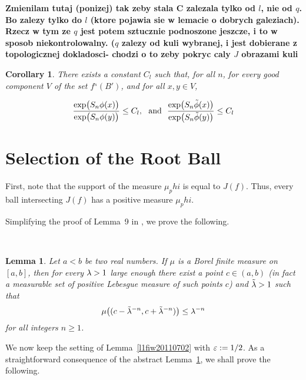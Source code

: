 \documentclass[12pt]{amsart}
\numberwithin{equation}{section}
\newcommand{\blem}{\begin{lem}}
\newcommand{\elem}{\end{lem}}
\newcommand{\nl}{\newline}
\newtheorem{lem}[thm]{Lemma}
\newtheorem{cor}[thm]{Corollary}
\def\({\bigl(}                \def\){\bigr)}
\def\sp{\medskip}             \def\fr{\noindent}        \def\nl{\newline}
\begin{document}
{\bf Zmienilam tutaj (ponizej) tak zeby stala C zalezala tylko od $l$, nie od $q$. Bo zalezy tylko do $l$ (ktore pojawia sie w lemacie o dobrych galeziach). Rzecz w tym ze $q$ jest potem sztucznie podnoszone jeszcze, i to w sposob niekontrolowalny. ($q$ zalezy od kuli wybranej, i jest dobierane  z topologicznej dokladosci- chodzi o to zeby pokryc caly $J$ obrazami kuli}
\begin{cor}
There exists a constant $C_l$ such that, for all $n$, for every good component $V$ of the set $f^{_n}(B')$, and for  all $x,y\in V$, 

\begin{equation}\label{potentialdistortion}
\frac{\exp\(S_n\phi(x)\)}{\exp\(S_n\phi(y)\)}\le C_l, ~~{\rm and}~~\frac{\exp\(S_n\tilde \phi(x)\)}{\exp\(S_n\tilde \phi(y)\)}\le C_l
\end{equation}
\end{cor}


\section{Selection of the Root Ball}

First, note that the support of the  measure $\mu_phi$ is equal to $J(f)$. Thus, every ball intersecting $J(f)$ has a positive measure $\mu_phi$. 

\sp\fr Simplifying the proof of Lemma~9 in \cite{SUZ1}, we prove the
following.

\

\blem\label{l320110702}
Let $a<b$ be two real numbers. If $\mu$ is a Borel finite measure on
$[a,b]$, then for every $\lambda>1$ large enough there exist a point $c\in
(a,b)$ (in fact a measurable set of positive Lebesgue measure of such
points $c$) and $\tilde{\lambda}>1$ such that
$$
\mu\((c-\tilde\l^{-n},c+\tilde\l^{-n})\)\le \l^{-n}
$$
for all integers $n\ge 1$.
\elem

\sp\fr We now keep the setting of Lemma~\ref{l1fiw20110702} with $\varepsilon:=1/2$. As a
straightforward consequence of the abstract Lemma~\ref{l320110702}, we
shall prove the following.
\end{document}
